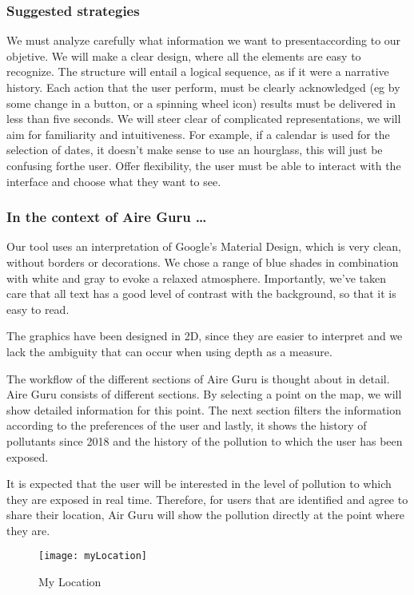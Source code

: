 \subsubsection*{Suggested strategies} 
We must analyze carefully what information we want to presentaccording to our objetive. We will make a clear design, where all the elements are easy to recognize.
The structure will entail a logical sequence, as if it were a narrative history.
Each action that the user perform, must be clearly acknowledged (eg by some change in a button, or a spinning wheel icon) results must be delivered in less than five seconds.
We will steer clear of complicated representations, we will aim for familiarity and intuitiveness.
For example, if a calendar is used for the selection of dates, it doesn't make sense to use an hourglass, this will just be confusing forthe user.
Offer flexibility, the user must be able to interact with the interface and choose what they want to see.

\subsubsection*{In the context of Aire Guru \ldots} 
Our tool uses an interpretation of Google's Material Design, which is very clean, without borders or decorations.
We chose a range of blue shades in combination with white and gray to evoke a relaxed atmosphere.
Importantly, we've taken care that all text has a good level of contrast with the background, so that it is easy to read.

The graphics have been designed in 2D, since they are easier to interpret and we lack the ambiguity that can occur when using depth as a measure.


The workflow of the different sections of Aire Guru is thought about in detail.
Aire Guru consists of different sections. By selecting a point on the map, we
will show detailed information for this point. The next section filters the information according to the preferences of the user
and lastly, it shows the history of pollutants since 2018 and the history of the pollution to which the user has been
exposed.

It is expected that the user will be interested in the level of pollution to which they are exposed in real time. Therefore, for users
that are identified and agree to share their location, Air Guru will show the pollution directly at the point where they are.


\begin{figure}[ht]
    \centering
    \texttt{[image: myLocation]}
    \caption{My Location}
\end{figure}

